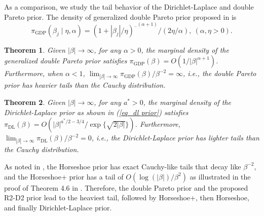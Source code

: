\documentclass[12pt]{article}
\newtheorem{theorem}{Theorem}
\newtheorem{proposition}{Proposition}
\begin{document}
As a comparison, we   study the tail behavior of the Dirichlet-Laplace   and double Pareto prior.  The  density of generalized double Pareto prior  proposed in \cite{armagan2013generalized} is
\[
\pi_{\text{GDP}}  ( \beta_j \mid \eta, \alpha )= ( 1+ |\beta_j| / \eta) ^ {_-(\alpha + 1)}/  (2\eta/\alpha) , \ (\alpha, \eta >0).
\]

\begin{theorem} \label{theorem_tail properties Pareto}
	Given  $|\beta| \rightarrow \infty$,  for any $\alpha>0$,
	the marginal density of the   generalized double Pareto prior    satisfies  $\pi_{\text{GDP}}(\beta)  = O( 1/ {|\beta|^{\alpha + 1}})  $.  Furthermore,  when $\alpha < 1$,
	$\lim_{|\beta|\rightarrow\infty} {\pi_{\text{GDP}}(\beta) }/{\beta^{-2} } = \infty $, i.e., the double Pareto  prior has heavier tails than the Cauchy distribution.
\end{theorem}


\begin{theorem} \label{theorem_tail properties DL}
	Given  $|\beta| \rightarrow \infty$,  for any $a^\ast>0$,
	the marginal density of the  Dirichlet-Laplace prior  as shown in (\ref{eq_dl prior})   satisfies  $\pi_{\text{DL}}(\beta)  = O( {|\beta|^{a^\ast/2-3/4}}/{  \exp\{ \sqrt{2|\beta|} \}  })  $.  Furthermore,
	$\lim_{|\beta|\rightarrow\infty} {\pi_{\text{DL}}(\beta) }/{\beta^{-2} } = 0 $, i.e., the Dirichlet-Laplace  prior has lighter tails than the Cauchy distribution.
\end{theorem}



%



As noted in \cite{carvalho2010horseshoe}, the Horseshoe prior has  exact Cauchy-like tails that decay like $\beta^{-2}$, and the Horseshoe+ prior has a tail of $O({\log(|\beta|)}/{\beta^2})$  as illustrated in the proof of Theorem 4$.$6 in \cite{bhadra2016horseshoe+}.
Therefore, the double Pareto prior and the  proposed   R2-D2  prior lead to   the heaviest tail, followed by  Horseshoe+,  then  Horseshoe, and  finally Dirichlet-Laplace prior.


\end{document}

